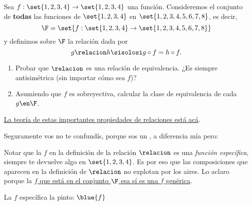 \begin{enunciado}{\ejercicio}
  Sea $f: \set{1,2,3,4} \to \set{1,2,3,4}$ una función.
  Consideremos el conjunto de \textbf{todas} las funciones de $\set{1,2,3,4}$ en $\set{1,2,3,4,5,6,7,8}$, es decir,
  $$
    \F = \set{f: \set{1,2,3,4} \to \set{1,2,3,4,5,6,7,8}}
  $$
  y definimos sobre $\F$ la relación dada por
  $$
    g \relacion h \sisolosi g \circ f = h\circ f.
  $$

  \begin{enumerate}[label=\roman*)]
    \item Probar  que $\relacion$ es una relación de equivalencia. ¿Es siempre antisimétrica (sin importar cómo sea $f$)?

    \item Asumiendo que $f$ es sobreyectiva, calcular la clase de equivalencia de cada $g \en \F$.
  \end{enumerate}
\end{enunciado}

\hyperlink{teoria-1:relaciones}{La teoría de estas importantes propiedades de relaciones está acá}.

Seguramente vos no te confundís, porque sos un {}, a diferencia mía pero:

\par
Notar que la $f$ en la definición de la relación $\relacion$
es una \textit{función específica}, siempre te devuelve algo en $\set{1,2,3,4}$. Es por eso que las composiciones que aparecen en la definición
de $\relacion$ no explotan  por los aires. Lo aclaro porque la \underline{$f$ que está en el conjunto $\F$ esa sí es una $f$ genérica}.\par
La $f$ específica la pinto: $\blue{f}$


